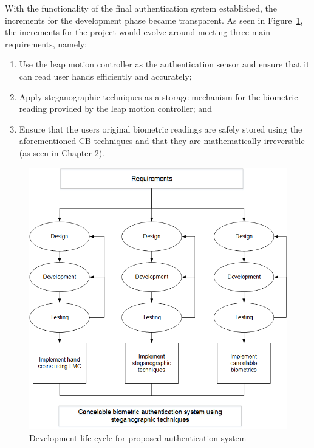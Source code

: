 With the functionality of the final authentication system established, the increments for the development phase became transparent. As seen in Figure~\ref{fig:Development life cycle for proposed authentication system}, the increments for the project would evolve around meeting three main requirements, namely:

    \begin{enumerate}[label=\roman*.]
        \item Use the leap motion controller as the authentication sensor and ensure that it can read user hands efficiently and accurately;
        \item Apply steganographic techniques as a storage mechanism for the biometric reading provided by the leap motion controller; and
        \item Ensure that the users original biometric readings are safely stored using the aforementioned CB techniques and that they are mathematically irreversible (as seen in Chapter 2).
    \end{enumerate}
    
    
    \begin{figure}[htbp!] 
    \centering    
    \includegraphics[width=1.0\textwidth]{Chapter3/Figs/Figure3-3.png}
    \caption[Development life cycle for proposed authentication system]{Development life cycle for proposed authentication system}
    \label{fig:Development life cycle for proposed authentication system}
    \end{figure}
    
